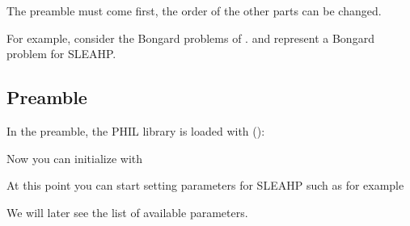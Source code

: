 \documentclass[letterpaper,10pt,english]{sphinxmanual}
\begin{document}
The preamble must come first, the order of the other parts can be changed.

For example, consider the Bongard problems of .  and  represent a Bongard problem for SLEAHP.


\subsection{Preamble}
\label{\detokenize{index:preamble}}
In the preamble, the PHIL library is loaded with ():

\begin{sphinxVerbatim}[commandchars=\\\{\}]
 
\end{sphinxVerbatim}

Now you can initialize  with

\begin{sphinxVerbatim}[commandchars=\\\{\}]
 
\end{sphinxVerbatim}

At this point you can start setting parameters for SLEAHP such as for example

\begin{sphinxVerbatim}[commandchars=\\\{\}]
 
 
 
 
 
\end{sphinxVerbatim}

We will later see the list of available parameters.
\end{document}
